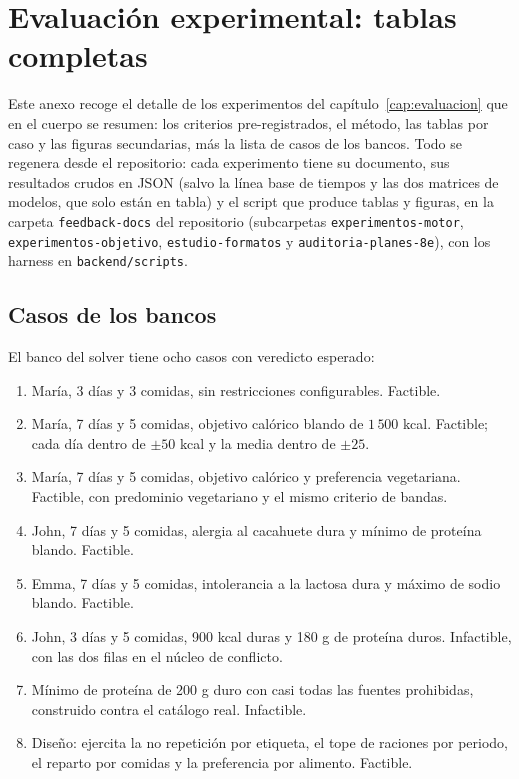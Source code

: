 \chapter{Evaluación experimental: tablas completas}
\label{apendice:evaluacion}

Este anexo recoge el detalle de los experimentos del capítulo~\ref{cap:evaluacion} que en el cuerpo se resumen: los criterios pre-registrados, el método, las tablas por caso y las figuras secundarias, más la lista de casos de los bancos. Todo se regenera desde el repositorio: cada experimento tiene su documento, sus resultados crudos en JSON (salvo la línea base de tiempos y las dos matrices de modelos, que solo están en tabla) y el script que produce tablas y figuras, en la carpeta \texttt{feedback-docs} del repositorio (subcarpetas \texttt{experimentos-motor}, \texttt{experimentos-objetivo}, \texttt{estudio-formatos} y \texttt{auditoria-planes-8e}), con los harness en \texttt{backend/scripts}.

\section{Casos de los bancos}
\label{sec:anexoCasosBancos}

El banco del solver tiene ocho casos con veredicto esperado:

\begin{enumerate}
\item María, 3 días y 3 comidas, sin restricciones configurables. Factible.
\item María, 7 días y 5 comidas, objetivo calórico blando de $1\,500$ kcal. Factible; cada día dentro de $\pm 50$ kcal y la media dentro de $\pm 25$.
\item María, 7 días y 5 comidas, objetivo calórico y preferencia vegetariana. Factible, con predominio vegetariano y el mismo criterio de bandas.
\item John, 7 días y 5 comidas, alergia al cacahuete dura y mínimo de proteína blando. Factible.
\item Emma, 7 días y 5 comidas, intolerancia a la lactosa dura y máximo de sodio blando. Factible.
\item John, 3 días y 5 comidas, 900 kcal duras y 180 g de proteína duros. Infactible, con las dos filas en el núcleo de conflicto.
\item Mínimo de proteína de 200 g duro con casi todas las fuentes prohibidas, construido contra el catálogo real. Infactible.
\item Diseño: ejercita la no repetición por etiqueta, el tope de raciones por periodo, el reparto por comidas y la preferencia por alimento. Factible.
\end{enumerate}

